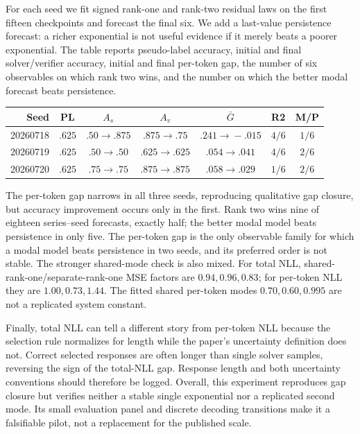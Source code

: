 \documentclass[10pt,twocolumn]{article}
\begin{document}
For each seed we fit signed rank-one and rank-two residual laws on the first
fifteen checkpoints and forecast the final six.  We add a last-value
persistence forecast: a richer exponential is not useful evidence if it merely
beats a poorer exponential.  The table reports pseudo-label accuracy, initial
and final solver/verifier accuracy, initial and final per-token gap, the number
of six observables on which rank two wins, and the number on which the better
modal forecast beats persistence.
\begin{center}
\scriptsize
\setlength{\tabcolsep}{3pt}
\begin{tabular}{rcccccc}
\hline
Seed & PL & $A_s$ & $A_v$ & $\bar G$ & R2 & M/P\\
\hline
20260718 & $.625$ & $.50\!\to\!.875$ & $.875\!\to\!.75$ & $.241\!\to\!-.015$ & $4/6$ & $1/6$\\
20260719 & $.625$ & $.50\!\to\!.50$ & $.625\!\to\!.625$ & $.054\!\to\!.041$ & $4/6$ & $2/6$\\
20260720 & $.625$ & $.75\!\to\!.75$ & $.875\!\to\!.875$ & $.058\!\to\!.029$ & $1/6$ & $2/6$\\
\hline
\end{tabular}
\end{center}

The per-token gap narrows in all three seeds, reproducing qualitative gap
closure, but accuracy improvement occurs only in the first.  Rank two wins
nine of eighteen series--seed forecasts, exactly half; the better modal model
beats persistence in only five.  The per-token gap is the only observable
family for which a modal model beats persistence in two seeds, and its
preferred order is not stable.  The stronger shared-mode check is also mixed.
For total NLL, shared-rank-one/separate-rank-one MSE factors are
$0.94,0.96,0.83$; for per-token NLL they are $1.00,0.73,1.44$.  The fitted
shared per-token modes $0.70,0.60,0.995$ are not a replicated system constant.

Finally, total NLL can tell a different story from per-token NLL because the
selection rule normalizes for length while the paper's uncertainty definition
does not.  Correct selected responses are often longer than single solver
samples, reversing the sign of the total-NLL gap.  Response length and both
uncertainty conventions should therefore be logged.  Overall, this experiment
reproduces gap closure but verifies neither a stable single exponential nor a
replicated second mode.  Its small evaluation panel and discrete decoding
transitions make it a falsifiable pilot, not a replacement for the published
scale.
\end{document}
